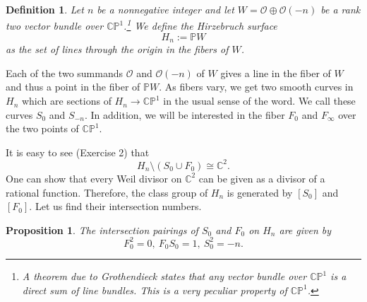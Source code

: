 \documentclass[11pt]{article}
\numberwithin{equation}{section}
\numberwithin{footnote}{section}
\newtheorem{prop}[thm]{Proposition}
\newtheorem{defn}[thm]{Definition}
\renewcommand{\P}{{\mathbb P}}
\newcommand{\C}{{\mathbb C}}
\begin{document}
\smallskip
\begin{defn}\label{Hirz}
Let $n$ be a nonnegative integer and let $W=\mathcal O\oplus \mathcal O(-n)$ be a rank two vector bundle over $\C\P^1$.\footnote{ A theorem due to Grothendieck states that any vector bundle over $\C\P^1$ is a direct sum of line bundles. This is a very peculiar property of $\C\P^1$.} 
We define the Hirzebruch surface 
$$H_n:= 
\P W
$$
as the set of lines through the origin in the fibers of $W$.
\end{defn}

\smallskip
Each of the two summands $\mathcal O$ and $\mathcal O(-n)$ of $W$ gives a line in the fiber of $W$ and thus a point in the fiber of $\P W$. As fibers vary, we get two smooth curves in $H_n$ which are sections of $H_n\to \C\P^1$ in the usual sense of the word. We call these curves $S_0$ and $S_{-n}$. In addition, we will be interested in the fiber $F_0$ and $F_\infty$ over the two points of $\C\P^1$.

\hskip 40pt

\noindent
It is easy to see (Exercise 2) that 
\begin{equation}\label{Hnminus}
H_n \setminus \left(
S_0\cup F_0
\right)\cong \C^2.
\end{equation}
One can show that every Weil divisor on $\C^2$ can be given as a divisor of a rational function. Therefore, the class group of $H_n$ is generated by $[S_0]$ and $[F_0]$. Let us find their intersection numbers.

\smallskip
\begin{prop}
The intersection pairings of $S_0$ and $F_0$ on  $H_n$ are given by 
$$
F_0^2 = 0 ,~ F_0 S_0 = 1,~S_0^2 = -n.
$$
\end{prop}
\end{document}

